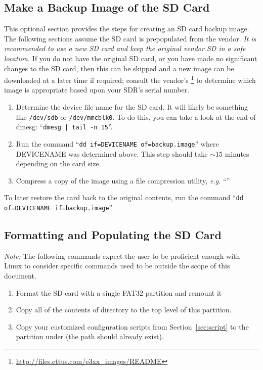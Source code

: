 \subsection{Make a Backup Image of the SD Card}
This optional section provides the steps for creating an SD card backup image. The following sections assume the SD card is prepopulated from the vendor. \textit{It is recommended to use a new SD card and keep the original vendor SD in a safe location.} If you do not have the original SD card, or you have made no significant changes to the SD card, then this can be skipped and a new image can be downloaded at a later time if required; consult the vendor's \footnote{\url{http://files.ettus.com/e3xx_images/README}} to determine which image is appropriate based upon your SDR's serial number.
\begin{enumerate}
\item Determine the device file name for the SD card. It will likely be something like \texttt{/dev/sdb} or \texttt{/dev/mmcblk0}. To do this, you can take a look at the end of dmesg: ``\texttt{dmesg | tail -n 15}''.
\item Run the command ``\texttt{dd if=DEVICENAME of=backup.image}'' where DEVICENAME was determined above. This step should take $\sim15$ minutes depending on the card size.
\item Compress a copy of the image using a file compression utility, \textit{e.g.} ``''
\end{enumerate}
\noindent To later restore the card back to the original contents, run the command ``\texttt{dd of=DEVICENAME if=backup.image}''

\subsection{Formatting and Populating the SD Card}
\textit{Note:} The following commands expect the user to be proficient enough with Linux to consider specific commands used to be outside the scope of this document.
\begin{enumerate}
\item Format the SD card with a single FAT32 partition and remount it
\item Copy all of the contents of  directory to the top level of this partition.
\item Copy your customized configuration scripts from Section~\ref{sec:script} to the partition under  (the path should already exist).
\end{enumerate}

